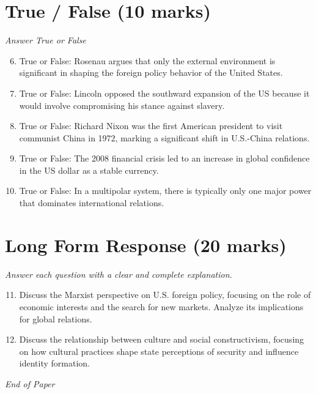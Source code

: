 \documentclass[12pt]{article}
\begin{document}
\section*{True / False (10 marks)}
\textit{Answer True or False}
\begin{enumerate}[label=\arabic*.]
\setcounter{enumi}{5}
\item True or False: Rosenau argues that only the external environment is significant in shaping the foreign policy behavior of the United States.
\item True or False: Lincoln opposed the southward expansion of the US because it would involve compromising his stance against slavery.
\item True or False: Richard Nixon was the first American president to visit communist China in 1972, marking a significant shift in U.S.-China relations.
\item True or False: The 2008 financial crisis led to an increase in global confidence in the US dollar as a stable currency.
\item True or False: In a multipolar system, there is typically only one major power that dominates international relations.
\end{enumerate}

\section*{Long Form Response (20 marks)}
\textit{Answer each question with a clear and complete explanation.}
\begin{enumerate}[label=\arabic*.]
\setcounter{enumi}{10}
\item Discuss the Marxist perspective on U.S. foreign policy, focusing on the role of economic interests and the search for new markets. Analyze its implications for global relations.
\item Discuss the relationship between culture and social constructivism, focusing on how cultural practices shape state perceptions of security and influence identity formation.
\end{enumerate}

\vfill
\noindent\textit{End of Paper}
\end{document}
